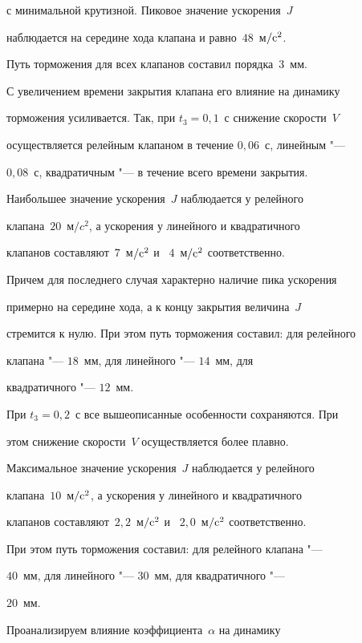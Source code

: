 с минимальной крутизной. Пиковое значение ускорения~$J$

наблюдается на середине хода клапана и равно~$48$~м$/\rm c^{2}$.



Путь торможения для всех клапанов составил порядка~$3$~мм.



С увеличением времени закрытия клапана его влияние на динамику

торможения усиливается. Так, при $t_3=0,1$~с снижение скорости~$V$

осуществляется релейным клапаном в течение $0,06$~с, линейным "---

$0,08$~с, квадратичным "--- в течение всего времени закрытия.

Наибольшее значение ускорения~$J$ наблюдается у релейного

клапана~$20$~м$/c^2$, а ускорения у линейного и квадратичного

клапанов составляют~$7$~м$/\rm c^{2}$ и ~$4$~м$/\rm c^{2}$ соответственно.

Причем для последнего случая характерно наличие пика ускорения

примерно на середине хода, а к концу закрытия величина~$J$

стремится к нулю. При этом путь торможения составил: для релейного

клапана "--- $18$~мм, для линейного "--- $14$~мм, для

квадратичного "--- $12$~мм.

\pagebreak



При $t_3=0,2$~с все вышеописанные особенности сохраняются. При

этом снижение скорости~$V$ осуществляется более плавно.

Максимальное значение ускорения~$J$ наблюдается у релейного

клапана~$10$~м$/\rm c^2$, а ускорения у линейного и квадратичного

клапанов составляют~$2,2$~м$/\rm c^2$ и ~$2,0$~м$/\rm c^2$ соответственно.

При этом путь торможения составил: для релейного клапана "---

$40$~мм, для линейного "--- $30$~мм, для квадратичного "---

$20$~мм.



Проанализируем влияние коэффициента~$\alpha$ на динамику

